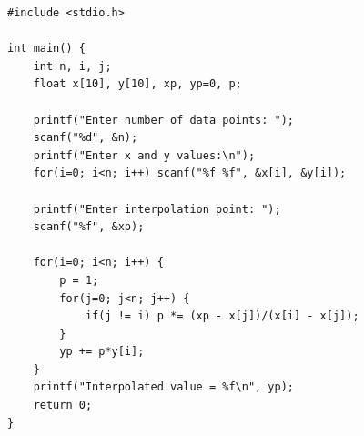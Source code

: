 \begin{verbatim}
#include <stdio.h>

int main() {
    int n, i, j;
    float x[10], y[10], xp, yp=0, p;

    printf("Enter number of data points: ");
    scanf("%d", &n);
    printf("Enter x and y values:\n");
    for(i=0; i<n; i++) scanf("%f %f", &x[i], &y[i]);

    printf("Enter interpolation point: ");
    scanf("%f", &xp);

    for(i=0; i<n; i++) {
        p = 1;
        for(j=0; j<n; j++) {
            if(j != i) p *= (xp - x[j])/(x[i] - x[j]);
        }
        yp += p*y[i];
    }
    printf("Interpolated value = %f\n", yp);
    return 0;
}
\end{verbatim}